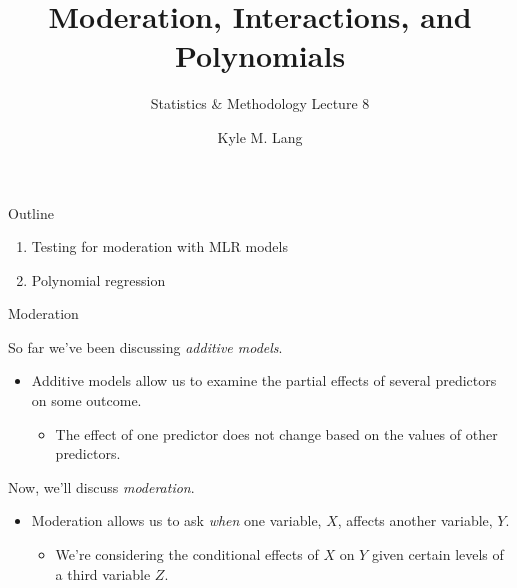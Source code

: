 \documentclass{beamer}\usepackage[]{graphicx}\usepackage[]{color}
\title{Moderation, Interactions, and Polynomials}
\subtitle{Statistics \& Methodology Lecture 8}
\author{Kyle M. Lang}
\institute{Department of Methodology \& Statistics\\Tilburg University}
\date{}
\begin{document}
\begin{frame}[t,plain]
\titlepage
\end{frame}


\begin{frame}{Outline}

  \begin{enumerate}
  \item Testing for moderation with MLR models
    \va
  \item Polynomial regression
  \end{enumerate}
  
\end{frame}


\begin{frame}{Moderation}

  So far we've been discussing \emph{additive models}.
  \vb
  \begin{itemize}
  \item Additive models allow us to examine the partial effects of several
    predictors on some outcome.
    \vc
    \begin{itemize}
    \item The effect of one predictor does not change based on the values of 
      other predictors.
    \end{itemize}
  \end{itemize}
  \va
  Now, we'll discuss \emph{moderation}.
  \vb
  \begin{itemize}
  \item Moderation allows us to ask \emph{when} one variable, $X$, affects
    another variable, $Y$.
    \vc
    \begin{itemize}
    \item We're considering the conditional effects of $X$ on $Y$ given certain 
      levels of a third variable $Z$.
    \end{itemize}
  \end{itemize}

\end{frame}

\end{document}
